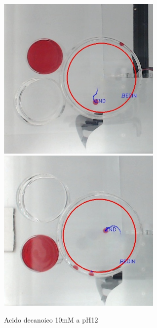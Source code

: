 \begin{figure}[h]
	\centering
   		{\includegraphics[width=8cm]{immagini/10mMpH12-2.jpg}}
 	\hspace{2mm}   	
		{\includegraphics[width=8cm]{immagini/10mMpH12-1.jpg}}
	\caption{Acido decanoico 10mM a pH12}
\end{figure}   
